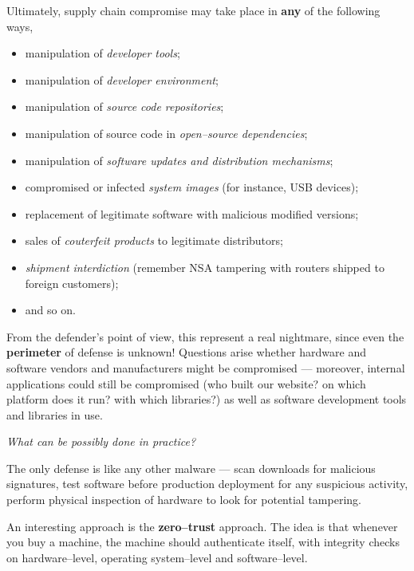 \documentclass[10pt]{extreport}
\begin{document}
Ultimately, supply chain compromise may take place in \textbf{any} of the
following ways,
\begin{itemize}
    \item manipulation of \emph{developer tools};
    \item manipulation of \emph{developer environment};
    \item manipulation of \emph{source code repositories};
    \item manipulation of source code in \emph{open--source dependencies};
    \item manipulation of \emph{software updates and distribution mechanisms};
    \item compromised or infected \emph{system images} (for instance, USB
        devices);
    \item replacement of legitimate software with malicious modified versions;
    \item sales of \emph{couterfeit products} to legitimate distributors;
    \item \emph{shipment interdiction} (remember NSA tampering with routers
        shipped to foreign customers);
    \item and so on.
\end{itemize}

From the defender's point of view, this represent a real nightmare, since even
the \textbf{perimeter} of defense is unknown! Questions arise whether hardware
and software vendors and manufacturers might be compromised --- moreover,
internal applications could still be compromised (who built our
website? on which platform does it run? with which libraries?) as well as
software development tools and libraries in use.

\vspace*{1cm}

\begin{center}
\emph{What can be possibly done in practice?}
\end{center}

\vspace*{1cm}

The only defense is like any other malware --- scan downloads for malicious
signatures, test software before production deployment for any suspicious
activity, perform physical inspection of hardware to look for potential
tampering.

An interesting approach is the \textbf{zero--trust} approach. The idea is that
whenever you buy a machine, the machine should authenticate itself, with
integrity checks on hardware--level, operating system--level and
software--level.
\end{document}
